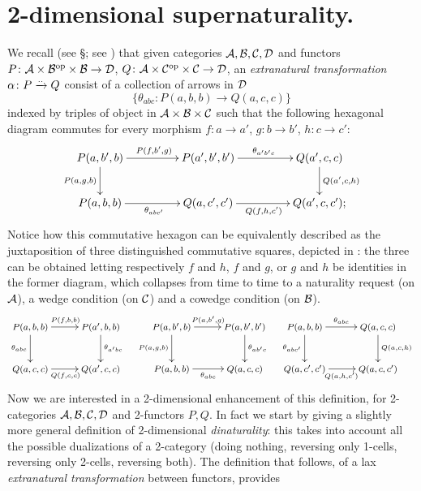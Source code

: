 \appendix
\section{2-dimensional supernaturality.}
We recall (see §; see \cite{eilenberg1966generalization,McL}) that given categories $\mathcal{A},\mathcal{B},\mathcal{C},\mathcal{D}$ and functors $P\colon \mathcal{A}\times \mathcal{B}^{\text{op}}\times\mathcal{B}\to \mathcal{D}$, $Q\colon \mathcal{A}\times \mathcal{C}^{\text{op}}\times\mathcal{C} \to \mathcal{D}$, an \emph{extranatural transformation} $\alpha\colon P\xrightarrow{..}Q$ consist of a collection of arrows  in $\mathcal{D}$
\[
  \big\{\theta_{abc}\colon P(a,b,b) \longrightarrow Q(a, c,c)\big\}
\]
indexed by triples of object in $\mathcal{A}\times\mathcal{B}\times\mathcal{C}$ such that the following hexagonal diagram commutes for every morphism $f\colon a\to a'$, $g\colon b\to b'$, $h\colon c\to c'$:
\[
  \vcenter{\xymatrix@C=1.6cm{
  P(a,b',b) \ar[r]^{P(f,b',g)}\ar[d]_{P(a,g,b)} & P(a', b', b') \ar[r]^{\theta_{a'b'c}} & Q(a', c,c) \ar[d]^{Q(a', c,h)}\\
  P(a,b,b) \ar[r]_{\theta_{abc'}} & Q(a, c', c') \ar[r]_{Q(f,h,c')} & Q(a', c, c');
  }}
\]
Notice how this commutative hexagon can be equivalently described as the juxtaposition of three distinguished commutative squares, depicted in \cite{eilenberg1966generalization}: the three can be obtained letting respectively $f$ and $h$, $f$ and $g$, or $g$ and $h$ be identities in the former diagram, which collapses from time to time to a naturality request (on $\mathcal{A}$), a wedge condition (on $\mathcal{C}$) and a cowedge condition (on $\mathcal{B}$).
\begin{gather}\notag\footnotesize
\xymatrix{
P(a, b,b) \ar[r]^{P(f,b,b)}\ar[d]_{\theta_{abc}}&\ar[d]^{\theta_{a'bc}} P(a', b,b) \\
Q(a,c,c) \ar[r]_{Q(f,c,c)}& Q(a', c,c)
}\quad 
\xymatrix{
P(a,b',b) \ar[r]^{P(a,b',g)}\ar[d]_{P(a,g,b)}&\ar[d]^{\theta_{ab'c}} P(a, b', b') \\
P(a,b,b) \ar[r]_{\theta_{abc}}& Q(a, c,c)
}\quad 
\xymatrix{
P(a,b,b) \ar[r]^{\theta_{abc}}\ar[d]_{\theta_{abc'}}&\ar[d]^{Q(a,c,h)} Q(a, c,c) \\
Q(a, c', c') \ar[r]_{Q(a,h,c')}& Q(a, c, c')
}
\end{gather}
Now we are interested in a 2-dimensional enhancement of this definition, for 2-categories $\mathcal{A},\mathcal{B},\mathcal{C},\mathcal{D}$ and 2-functors $P,Q$. In fact we start by giving a slightly more general definition of 2-dimensional \emph{dinaturality}: this takes into account all the possible dualizations of a 2-category (doing nothing, reversing only 1-cells, reversing only 2-cells, reversing both). The definition that follows, of a lax \emph{extranatural transformation} between functors, provides
